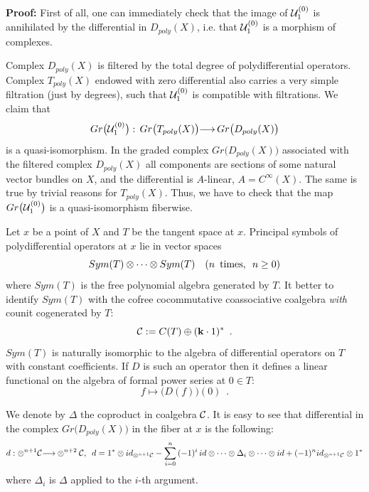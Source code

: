    {\bf Proof:} First of all, one can immediately check that the image of
    ${\cal U}_1^{(0)}$ is annihilated by the differential in $D_{poly}(X)$,
     i.e. that ${\cal U}_1^{(0)}$ is a morphism of complexes.
     
      Complex $D_{poly}(X)$ is filtered by the total degree of 
      polydifferential operators. Complex $T_{poly}(X)$ endowed with zero 
      differential
       also carries a very simple  filtration (just by degrees), 
        such that ${\cal U}_1^{(0)}$
        is compatible with filtrations. We claim that 
        $$Gr\bigl({\cal U}_1^{(0)}\bigr):\,Gr\bigl(T_{poly}(X)\bigr)
        {\longrightarrow} \,Gr\bigl(D_{poly}(X)\bigr)$$
         is a quasi-isomorphism. In the graded complex 
         $Gr\bigl(D_{poly}(X)\bigr)$ 
         associated with the filtered complex
          $D_{poly}(X)$ all components are sections of some natural
           vector bundles on $X$, and the differential is
          $A$-linear, $A=C^{\infty}(X)$. 
          The same is true by trivial reasons for 
           $T_{poly}(X)$. Thus, we have to check that the map 
           $Gr\bigl({\cal U}_1^{(0)}\bigr)$  
            is a quasi-isomorphism fiberwise.
            
            Let $x$ be a point of $X$ and $T$ be the tangent space
             at $x$. Principal symbols of polydifferential operators
              at $x$ lie in vector spaces
              $$Sym(T)\otimes\dots\otimes Sym(T)\,\,\,\,\,\,(
              n\,\,\,{\rm times},\,\,\,n\ge 0)$$
               where $Sym(T)$ is the free polynomial algebra generated by $T$.
              It better to identify $Sym(T)$ with the cofree
               cocommutative coassociative coalgebra {\it with} counit
                cogenerated by $T$:
                $${\cal C}:=C(T)\oplus ({\bf k}\cdot 1)^*\,\,\,. $$
              $Sym(T)$ is naturally isomorphic to the algebra
                 of differential operators on $T$ with constant coefficients.
                If $D$ is such an operator then it defines a linear functional
                 on the algebra of formal power series at $0\in T$:
                 $$f\mapsto \bigl(D(f)\bigr)(0)\,\,\,.$$ 
                 
                 We denote by $\Delta$ the coproduct in coalgebra ${\cal C}$. 
                 It is easy to see that differential in the complex 
                 $Gr\bigl(D_{poly}(X)\bigr)$ in the fiber at $x$ is 
                 the following:
                 $$d: \otimes ^{n+1}{\cal C}{\longrightarrow} \otimes^{n+2}{\cal C},\,\,\,
                 d=1^*\otimes
                 id_{\otimes^{n+1}{\cal C}}
                 -\sum_{i=0}^n \,(-1)^i\,id\otimes\dots\otimes 
                 \Delta_i\otimes
                 \dots\otimes id+(-1)^n id_{\otimes^{n+1}{\cal C}}\otimes 1^*
                  $$
                 where $\Delta_i$ is 
                  $\Delta$ applied to the $i$-th argument.
                  
